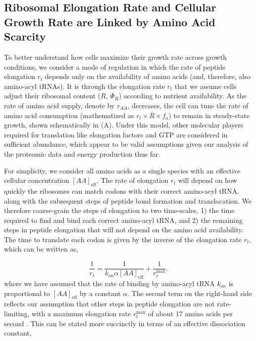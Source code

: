 \subsection{Ribosomal Elongation Rate and Cellular Growth Rate are Linked by
Amino Acid Scarcity}
To better understand how cells maximize their growth rate across growth
conditions, we consider a mode of regulation in which the rate of peptide
elongation $r_t$ depends only on the availability of amino acids (and,
therefore, also amino-acyl tRNAs). It is through the elongation rate $r_t$ that
we assume cells adjust their ribosomal content ($R$, $\Phi_R$) according to
nutrient availability.  As the rate of amino acid supply, denote by $r_{AA}$,
decreases, the cell can tune the  rate of amino acid consumption (mathematized
as $r_t \times R \times f_a$) to remain in steady-state growth, shown
schematically in (A). Under this model,
other molecular players required for translation like elongation factors and GTP
are considered in sufficient abundance, which appear to be valid assumptions
given our analysis of the proteomic data and energy production thus far.

For simplicity, we consider all amino acids as a single
species with an effective cellular concentration $[AA]_\text{eff}$. The
rate of elongation $r_t$ will depend on how quickly the ribosomes can match
codons with their correct amino-acyl tRNA, along with the subsequent steps of
peptide bond formation and translocation. We therefore coarse-grain the steps of
elongation to two time-scales,  1) the time required
to find and bind each correct amino-acyl tRNA, and 2) the remaining steps in
peptide elongation that will not depend on the amino acid availability. The
time to translate each codon is given by the inverse of the elongation rate
$r_t$, which can be written as,

\begin{equation}
\frac{1}{r_t} = \frac{1}{k_{on} \alpha [AA]_{\text{eff}}} + \frac{1}{r_{t}^{\text{max}}}.
\end{equation}
where we have assumed that the rate of binding by amino-acyl tRNA $k_{on}$ is
proportional to $[AA]_{\text{eff}}$ by a constant $\alpha$. The second term on the
right-hand side reflects our assumption that other steps in peptide elongation
are not rate-limiting, with a maximum elongation rate $r_{t}^{\text{max}}$ of
about 17 amino acids per second \cite{dai2016}. This can be stated more succinctly in
terms of an effective dissociation constant,

